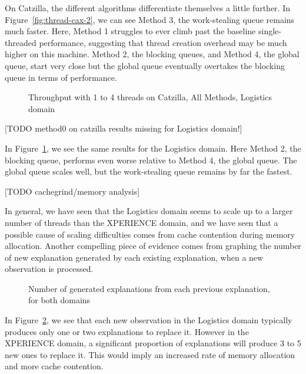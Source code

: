 On Catzilla, the different algorithms differentiate themselves a little further. In Figure~\ref{fig:thread-cax-2}, we can see Method 3, the work-stealing queue remains much faster. Here, Method 1 struggles to ever climb past the baseline single-threaded performance, suggesting that thread creation overhead may be much higher on this machine. Method 2, the blocking queues, and Method 4, the global queue, start very close but the global queue eventually overtakes the blocking queue in terms of performance.

\begin{figure}[!htbp]
\begin{centering}
\texttt{[image: \{\{images/threads-log3-catzilla.inf.ed.ac.uk-all-2]}}}
\end{centering}
\caption{Throughput with 1 to 4 threads on Catzilla, All Methods, Logistics domain}
\label{fig:thread-cal-2}
\end{figure}

[TODO method0 on catzilla results missing for Logistics domain!]

In Figure~\ref{fig:thread-cal-2}, we see the same results for the Logistics domain. Here Method 2, the blocking queue, performs even worse relative to Method 4, the global queue. The global queue scales well, but the work-stealing queue remains by far the fastest.

[TODO cachegrind/memory analysis]

In general, we have seen that the Logistics domain seems to scale up to a larger number of threads than the XPERIENCE domain, and we have seen that a possible cause of scaling difficulties comes from cache contention during memory allocation. Another compelling piece of evidence comes from graphing the number of new explanation generated by each existing explanation, when a new observation is processed.

\begin{figure}[!htbp]
\begin{centering}
\texttt{[image: \{\{images/histogram]}}}
\end{centering}
\caption{Number of generated explanations from each previous explanation, for both domains}
\label{fig:hist}
\end{figure}

In Figure~\ref{fig:hist}, we see that each new observation in the Logistics domain typically produces only one or two explanations to replace it. However in the XPERIENCE domain, a significant proportion of explanations will produce 3 to 5 new ones to replace it. This would imply an increased rate of memory allocation and more cache contention.